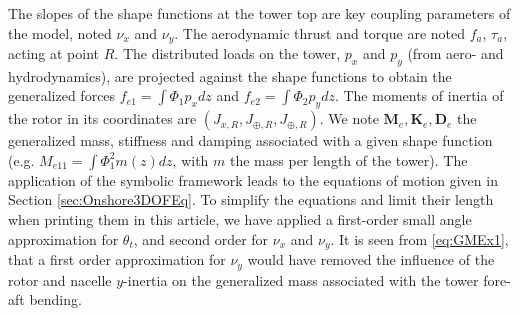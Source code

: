 \documentclass[wes, manuscript]{copernicus}
\renewcommand{\v}[1]{\boldsymbol{#1}}
\newcommand{\m}[1]{\boldsymbol{#1}}
\begin{document}
The slopes of the shape functions at the tower top are key coupling parameters of the model, noted $\nu_x$ and $\nu_y$. 
The aerodynamic thrust and torque are noted $f_a$, $\tau_a$, acting at point $R$. The distributed loads on the tower, $p_x$ and $p_y$ (from aero- and hydrodynamics), are projected against the shape functions to obtain the generalized forces $f_{e1}=\int \Phi_1 p_x dz$ and  $f_{e2}=\int \Phi_2 p_y dz$. 
The moments of inertia of the rotor in its coordinates are $(J_{x,R}, J_{\oplus,R}, J_{\oplus,R})$. We note $\m{M}_e, \m{K}_e, \m{D}_e$  the generalized mass, stiffness and damping associated with a given shape function (e.g. $M_{e11}=\int \Phi_1^2 m(z) dz$, with $m$ the mass per length of the tower). 
The application of the symbolic framework leads to the equations of motion given in Section \ref{sec:Onshore3DOFEq}.
To simplify the equations and limit their length when printing them in this article, we have applied a first-order small angle approximation for $\theta_t$, and second order for $\nu_x$ and $\nu_y$.
It is seen from \autoref{eq:GMEx1}, that a first order approximation for $\nu_y$ would have removed the influence of the rotor and nacelle $y$-inertia on the generalized mass associated with the tower fore-aft bending. 
\end{document}
